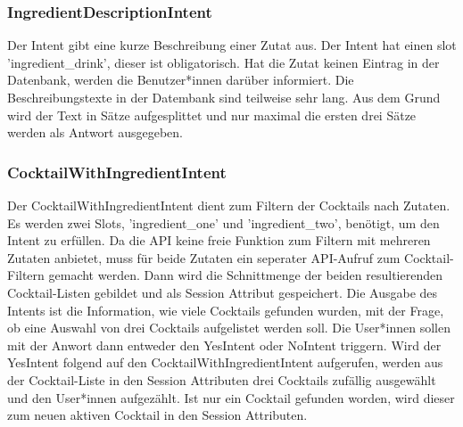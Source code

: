\documentclass[12pt,letterpaper]{article}
\begin{document}
\subsubsection{IngredientDescriptionIntent}
Der Intent gibt eine kurze Beschreibung einer Zutat aus. Der Intent hat einen slot 'ingredient\_drink', dieser ist obligatorisch. Hat die Zutat keinen Eintrag in der Datenbank, werden die Benutzer*innen darüber informiert. Die Beschreibungstexte in der Datembank sind teilweise sehr lang. Aus dem Grund wird der Text in Sätze aufgesplittet und nur maximal die ersten drei Sätze werden als Antwort ausgegeben. \\


\subsubsection{CocktailWithIngredientIntent}
Der CocktailWithIngredientIntent dient zum Filtern der Cocktails nach Zutaten. Es werden zwei Slots, 'ingredient\_one' und 'ingredient\_two', benötigt, um den Intent zu erfüllen. Da die API keine freie Funktion zum Filtern mit mehreren Zutaten anbietet, muss für beide Zutaten ein seperater API-Aufruf zum Cocktail-Filtern gemacht werden. Dann wird die Schnittmenge der beiden resultierenden Cocktail-Listen gebildet und als Session Attribut gespeichert. Die Ausgabe des Intents ist die Information, wie viele Cocktails gefunden wurden, mit der Frage, ob eine Auswahl von drei Cocktails aufgelistet werden soll. Die User*innen sollen mit der Anwort dann entweder den YesIntent oder NoIntent triggern. Wird der YesIntent folgend auf den CocktailWithIngredientIntent aufgerufen, werden aus der Cocktail-Liste in den Session Attributen drei Cocktails zufällig ausgewählt und den User*innen aufgezählt. Ist nur ein Cocktail gefunden worden, wird dieser zum neuen aktiven Cocktail in den Session Attributen. \\

\end{document}
